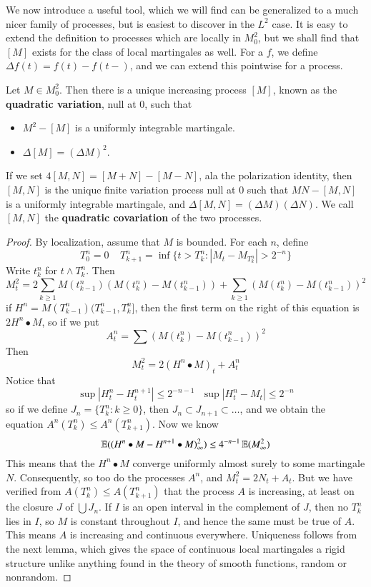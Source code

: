 We now introduce a useful tool, which we will find can be generalized to a much nicer family of processes, but is easiest to discover in the $L^2$ case. It is easy to extend the definition to processes which are locally in $M^2_0$, but we shall find that $[M]$ exists for the class of local martingales as well. For a \cadlag $f$, we define $\Delta f(t) = f(t) - f(t-)$, and we can extend this pointwise for a \cadlag process.

\begin{theorem}
    Let $M \in M^2_0$. Then there is a unique increasing \cadlag process $[M]$, known as the {\bf quadratic variation}, null at 0, such that
    \begin{itemize}
        \item $M^2 - [M]$ is a uniformly integrable martingale.
        \item $\Delta [M] = (\Delta M)^2$.
    \end{itemize}
    If we set $4[M,N] = [M + N] - [M - N]$, ala the polarization identity, then $[M,N]$ is the unique finite variation process null at 0 such that $MN - [M,N]$ is a uniformly integrable martingale, and $\Delta [M,N] = (\Delta M)(\Delta N)$. We call $[M,N]$ the {\bf quadratic covariation} of the two processes.
\end{theorem}
\begin{proof}
    By localization, assume that $M$ is bounded. For each $n$, define
    \[ T^n_0 = 0\ \ \ \ \ T^n_{k+1} = \inf \{ t > T^n_k : |M_t - M_{T^n_k}| > 2^{-n} \} \]
    Write $t^n_k$ for $t \wedge T^n_k$. Then
    \[ M_t^2 = 2 \sum_{k \geq 1} M(t^n_{k-1}) (M(t^n_k) - M(t^n_{k-1})) + \sum_{k \geq 1} (M(t^n_k) - M(t^n_{k-1}))^2 \]
    if $H^n = M(T^n_{k-1})(T^n_{k-1}, T^n_k]$, then the first term on the right of this equation is $2 H^n \bullet M$, so if we put
    \[ A^n_t = \sum (M(t^n_k) - M(t^n_{k-1}))^2 \]
    Then
    \[ M_t^2 = 2(H^n \bullet M)_t + A^n_t \]
    Notice that
    \[ \sup |H^n_t - H^{n+1}_t| \leq 2^{-n-1}\ \ \ \sup |H^n_t - M_t| \leq 2^{-n} \]
    so if we define $J_n = \{ T^n_k : k \geq 0 \}$, then $J_n \subset J_{n+1} \subset \dots$, and we obtain the equation $A^n(T^n_k) \leq A^n(T^n_{k+1})$. Now we know
    \[ \operatorname{\mathbb{E}}((H^n \bullet M - H^{n+1} \bullet M)_\infty^2) \leq 4^{-n-1} \operatorname{\mathbb{E}}(M_\infty^2) \]
    This means that the $H^n \bullet M$ converge uniformly almost surely to some martingale $N$. Consequently, so too do the processes $A^n$, and $M_t^2 = 2N_t + A_t$. But we have verified from $A(T^n_k) \leq A(T^n_{k+1})$ that the process $A$ is increasing, at least on the closure $J$ of $\bigcup J_n$. If $I$ is an open interval in the complement of $J$, then no $T^n_k$ lies in $I$, so $M$ is constant throughout $I$, and hence the same must be true of $A$. This means $A$ is increasing and continuous everywhere. Uniqueness follows from the next lemma, which gives the space of continuous local martingales a rigid structure unlike anything found in the theory of smooth functions, random or nonrandom.
\end{proof}

